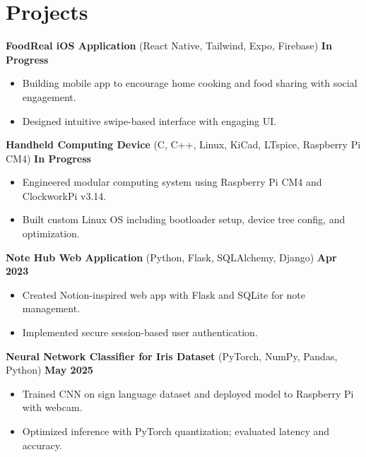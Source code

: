 \documentclass[letterpaper,11pt]{article}
\begin{document}
\iffalse 
\section*{Projects}
\textbf{FoodReal iOS Application} (React Native, Tailwind, Expo, Firebase) \hfill \textbf{In Progress}
\begin{itemize}
    \item Building mobile app to encourage home cooking and food sharing with social engagement.
    \item Designed intuitive swipe-based interface with engaging UI.
\end{itemize}
\vspace{4mm}
\textbf{Handheld Computing Device} (C, C++, Linux, KiCad, LTspice, Raspberry Pi CM4) \hfill \textbf{In Progress}
\begin{itemize}
    \item Engineered modular computing system using Raspberry Pi CM4 and ClockworkPi v3.14.
    \item Built custom Linux OS including bootloader setup, device tree config, and optimization.
\end{itemize}
\vspace{4mm}
\textbf{Note Hub Web Application} (Python, Flask, SQLAlchemy, Django) \hfill \textbf{Apr 2023}
\begin{itemize}
    \item Created Notion-inspired web app with Flask and SQLite for note management.
    \item Implemented secure session-based user authentication.
\end{itemize}
\vspace{4mm}
\textbf{Neural Network Classifier for Iris Dataset} (PyTorch, NumPy, Pandas, Python) \hfill \textbf{May 2025}
\begin{itemize}
    \item Trained CNN on sign language dataset and deployed model to Raspberry Pi with webcam.
    \item Optimized inference with PyTorch quantization; evaluated latency and accuracy.
\end{itemize}
\vspace{4mm}

\end{document}
